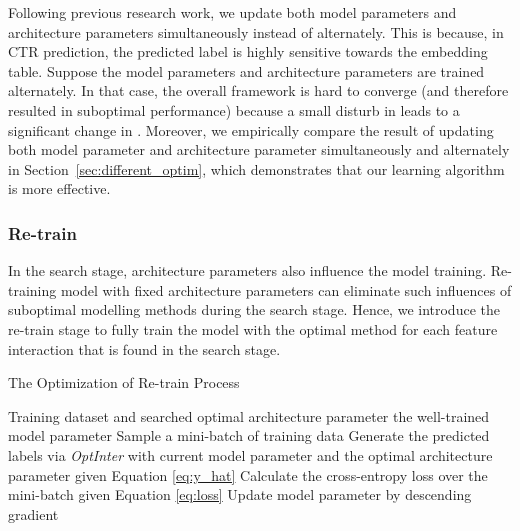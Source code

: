 \documentclass[conference]{IEEEtran}
\begin{document}
Following previous research work\cite{AutoFis}, we update both model parameters  and architecture parameters  simultaneously instead of alternately. This is because, in CTR prediction, the predicted label  is highly sensitive towards the embedding table. Suppose the model parameters  and architecture parameters  are trained alternately. In that case, the overall framework is hard to converge (and therefore resulted in suboptimal performance) because a small disturb in  leads to a significant change in . 
Moreover, we empirically compare the result of updating both model parameter  and architecture parameter  simultaneously and alternately in Section~\ref{sec:different_optim}, which demonstrates that our learning algorithm is more effective.

\subsubsection{Re-train}

In the search stage, architecture parameters also influence the model training. Re-training model with fixed architecture parameters can eliminate such influences of suboptimal modelling methods during the search stage. Hence, we introduce the re-train stage to fully train the model with the optimal method for each feature interaction that is found in the search stage. 

\begin{algorithm}
    \caption{The Optimization of Re-train Process}
    \label{alg:retrain}
    \begin{algorithmic}[1]
    	\Require Training dataset  and searched optimal architecture parameter 
    	\Ensure the well-trained model parameter 
            \State Sample a mini-batch of training data 
            \State Generate the predicted labels  via \textit{OptInter} with 
            \Statex \qquad current model parameter  and the optimal  
            \Statex \qquad architecture parameter  given Equation \ref{eq:y_hat}
            \State Calculate the cross-entropy loss  over
            \Statex \qquad the mini-batch given Equation \ref{eq:loss}
            \State Update model parameter  by descending gradient 
            \Statex \qquad 
        \EndWhile
    \end{algorithmic}
\end{algorithm}
\end{document}
